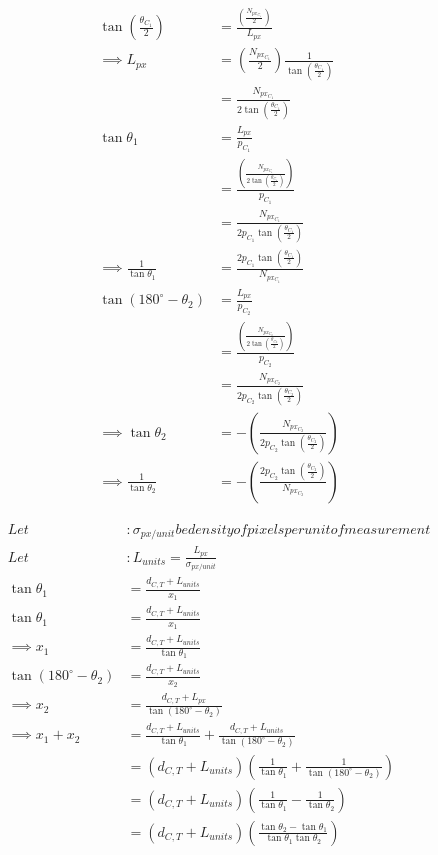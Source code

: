 \documentclass{article}
\begin{document}
	\begin{align}
	\tan \left(\frac{\theta_{C_{1}}}{2}\right) &=  \frac{\left(\frac{N_{px_{C_{1}}}}{2}\right)}{L_{px}} \\
	\implies L_{px} &= \left(\frac{N_{px_{C_{1}}}}{2}\right) \frac{1}{\tan \left(\frac{\theta_{C_{1}}}{2}\right)} \\
	&= \frac{N_{px_{C_{1}}}}{2 \tan \left(\frac{\theta_{C_{1}}}{2}\right)} \\
	\tan \theta_{1} &= \frac{L_{px}}{p_{C_{1}}} \\
	&= \frac{\left(\frac{N_{px_{C_{1}}}}{2 \tan \left(\frac{\theta_{C_{1}}}{2}\right)}\right)}{p_{C_{1}}} \\
	&= \frac{N_{px_{C_{1}}}}{2 p_{C_{1}} \tan \left(\frac{\theta_{C_{1}}}{2}\right)} \\
	\implies \frac{1}{\tan \theta_{1}} &= \frac{2 p_{C_{1}} \tan \left(\frac{\theta_{C_{1}}}{2}\right)}{N_{px_{C_{1}}}} \\
	\tan \left(180^{\circ} - \theta_{2}\right) &= \frac{L_{px}}{p_{C_{2}}} \\
	&= \frac{\left(\frac{N_{px_{C_{2}}}}{2 \tan \left(\frac{\theta_{C_{2}}}{2}\right)}\right)}{p_{C_{2}}} \\
	&= \frac{N_{px_{C_{2}}}}{2 p_{C_{2}} \tan \left(\frac{\theta_{C_{2}}}{2}\right)} \\
	\implies \tan \theta_{2} &= -\left(\frac{N_{px_{C_{2}}}}{2 p_{C_{2}} \tan \left(\frac{\theta_{C_{2}}}{2}\right)}\right) \\
	\implies \frac{1}{\tan \theta_{2}} &= -\left(\frac{2 p_{C_{2}} \tan \left(\frac{\theta_{C_{2}}}{2}\right)}{N_{px_{C_{2}}}}\right)
	\end{align}
	
	\begin{align}
	Let &: \sigma_{px/unit} be density of pixels per unit of measurement \\
	Let &: L_{units} = \frac{L_{px}}{\sigma_{px/unit}} \\
	\tan \theta_{1} &= \frac{d_{C, T} + L_{units}}{x_{1}} \\
	\tan \theta_{1} &= \frac{d_{C, T} + L_{units}}{x_{1}} \\
	\implies x_{1} &= \frac{d_{C, T} + L_{units}}{\tan \theta_{1}} \\
	\tan \left({180^{\circ} - \theta_{2}}\right) &= \frac{d_{C, T} + L_{units}}{x_{2}} \\
	\implies x_{2} &= \frac{d_{C, T} + L_{px}}{\tan \left({180^{\circ} - \theta_{2}}\right)} \\
	\implies x_{1} + x_{2} &= \frac{d_{C, T} + L_{units}}{\tan \theta_{1}} + \frac{d_{C, T} + L_{units}}{\tan \left({180^{\circ} - \theta_{2}}\right)} \\
	&= \left(d_{C, T} + L_{units}\right) \left(\frac{1}{\tan \theta_{1}} + \frac{1}{\tan \left({180^{\circ} - \theta_{2}}\right)}\right) \\
	&= \left(d_{C, T} + L_{units}\right) \left(\frac{1}{\tan \theta_{1}} - \frac{1}{\tan \theta_{2}}\right) \\
	&= \left(d_{C, T} + L_{units}\right) \left(\frac{\tan \theta_{2} - \tan \theta_{1}}{\tan \theta_{1} \tan \theta_{2}}\right) \\
	\end{align}
	
\end{document}
